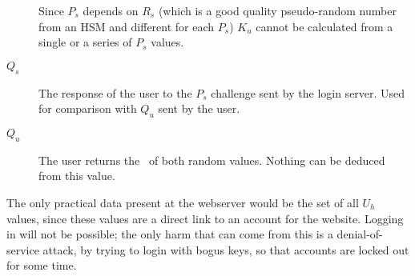 \begin{description}
				Since $P_s$ depends on $R_s$
				(which is a good quality pseudo-random number from an HSM and different for each $P_s$)
				$K_u$ cannot be calculated from a single or a series of $P_s$ values.
\item[$Q_s$]	The response of the user to the $P_s$ challenge sent by the login server.
				Used for comparison with $Q_u$ sent by the user.
\item[$Q_u$]	The user returns the \XOR\ of both random values.
				Nothing can be deduced from this value.
\end{description}
The only practical data present at the webserver would be the set of all $U_h$ values,
since these values are a direct link to an account for the website.
Logging in will not be possible;
the only harm that can come from this is a denial-of-service attack,
by trying to login with bogus keys,
so that accounts are locked out for some time.
